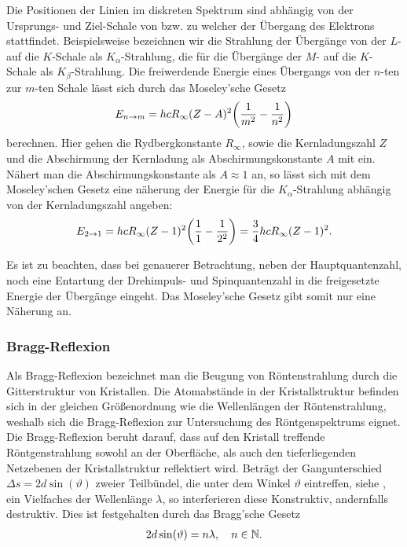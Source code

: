 Die Positionen der Linien im diskreten Spektrum sind abhängig von der Ursprungs- und Ziel-Schale von bzw. zu welcher der Übergang des Elektrons stattfindet. Beispielsweise bezeichnen wir die Strahlung der Übergänge von der $L$- auf die $K$-Schale als $K_{\alpha}$-Strahlung, die für die Übergänge der $M$- auf die $K$-Schale als $K_{\beta}$-Strahlung. Die freiwerdende Energie eines Übergangs von der $n$-ten zur $m$-ten Schale lässt sich durch das Moseley'sche Gesetz
\begin{align}
  E_{n\to m} = hc R_{\infty} (Z-A)^2 \qty(\frac{1}{m^2} - \frac{1}{n^2})
\end{align}
berechnen. Hier gehen die Rydbergkonstante $R_{\infty}$, sowie die Kernladungszahl $Z$ und die Abschirmung der Kernladung als Abschirmungskonstante $A$ mit ein. Nähert man die Abschirmungskonstante als $A \approx 1$ an, so lässt sich mit dem Moseley'schen Gesetz eine näherung der Energie für die $K_{\alpha}$-Strahlung abhängig von der Kernladungszahl angeben:
\begin{align}
  E_{2 \to 1} = hc R_{\infty} (Z - 1)^2 \qty(\frac{1}{1}- \frac{1}{2^2}) = \frac{3}{4} hc R_{\infty} (Z - 1)^2.
\end{align}

Es ist zu beachten, dass bei genauerer Betrachtung, neben der Hauptquantenzahl, noch eine Entartung der Drehimpuls- und Spinquantenzahl in die freigesetzte Energie der Übergänge eingeht. Das Moseley'sche Gesetz gibt somit nur eine Näherung an.

\subsubsection*{Bragg-Reflexion}

Als Bragg-Reflexion bezeichnet man die Beugung von Röntenstrahlung durch die Gitterstruktur von Kristallen. Die Atomabstände in der Kristallstruktur befinden sich in der gleichen Größenordnung wie die Wellenlängen der Röntenstrahlung, weshalb sich die Bragg-Reflexion zur Untersuchung des Röntgenspektrums eignet. Die Bragg-Reflexion beruht darauf, dass auf den Kristall treffende Röntgenstrahlung sowohl an der Oberfläche, als auch den tieferliegenden Netzebenen der Kristallstruktur reflektiert wird. Beträgt der Gangunterschied $\Delta s = 2 d \sin(\vartheta)$ zweier Teilbündel, die unter dem Winkel $\vartheta$ eintreffen, siehe , ein Vielfaches der Wellenlänge $\lambda$, so interferieren diese Konstruktiv, andernfalls destruktiv. Dies ist festgehalten durch das Bragg'sche Gesetz
\begin{align}
  2 d \sin(\vartheta) = n \lambda, \quad n \in \mathbb{N}. \label{eq:bragg}
\end{align}

